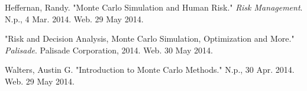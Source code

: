 \documentclass{article}
\begin{document}
\pagebreak

\begin{thebibliography}
\noindent{}
Heffernan, Randy. "Monte Carlo Simulation and Human Risk." \textit{Risk Management}. N.p., 4 Mar. 2014. Web. 29 May 2014.

\noindent{}
"Risk and Decision Analysis, Monte Carlo Simulation, Optimization and More." \textit{Palisade}. Palisade Corporation, 2014. Web. 30 May 2014.

\noindent{}
Walters, Austin G. "Introduction to Monte Carlo Methods." N.p., 30 Apr. 2014. Web. 29 May 2014.
\end{thebibliography}
\end{document}
